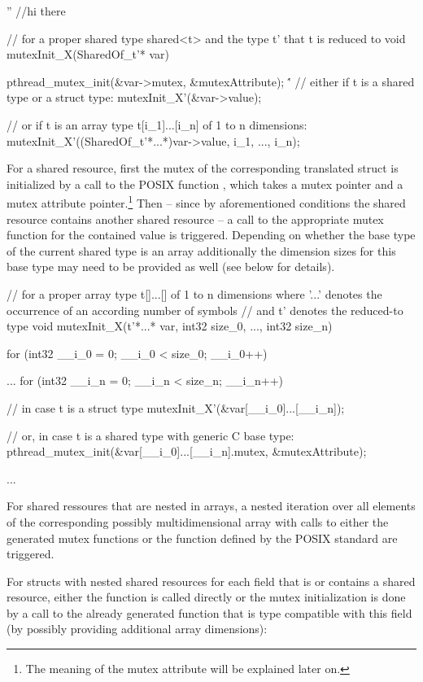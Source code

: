 \begin{ccode}
''
//hi there
\end{ccode}
\begin{ccode}
// for a proper shared type shared<t> and the type t' that t is reduced to
void mutexInit_X(SharedOf_t'* var) { 
  pthread_mutex_init(&var->mutex, &mutexAttribute);
  \''
  // either if t is a shared type or a struct type:
  mutexInit_X'(&var->value); 
  
  // or if t is an array type t[i_1]...[i_n] of 1 to n dimensions:
  mutexInit_X'((SharedOf_t'*...*)var->value, i_1, ..., i_n); 
}
\end{ccode}
For a shared resource, first the mutex of the corresponding translated struct is initialized by a call to the POSIX function , which takes a mutex pointer and a mutex attribute pointer.\footnote{The meaning of the mutex attribute will be explained later on.} Then -- since by aforementioned conditions the shared resource contains another shared resource -- a call to the appropriate mutex function for the contained value is triggered. Depending on whether the base type of the current shared type is an array additionally the dimension sizes for this base type may need to be provided as well (see below for details).

\begin{ccode}
// for a proper array type t[]...[] of 1 to n dimensions where '...' denotes the occurrence of an according number of symbols 
// and t' denotes the reduced-to type
void mutexInit_X(t'*...* var, int32 size_0, ..., int32 size_n) { 
  for (int32 __i_0 = 0; __i_0 < size_0; __i_0++) { 
    ...
      for (int32 __i_n = 0; __i_n < size_n; __i_n++) {
        // in case t is a struct type
        mutexInit_X'(&var[__i_0]...[__i_n]);
        
        // or, in case t is a shared type with generic C base type:
        pthread_mutex_init(&var[__i_0]...[__i_n].mutex, &mutexAttribute);
      }
    ...
  } 
}
\end{ccode}
For shared ressoures that are nested in arrays, a nested iteration over all elements of the corresponding possibly multidimensional array with calls to either the generated mutex functions or the function defined by the POSIX standard are triggered.

For structs with nested shared resources for each field that is or contains a shared resource, either the  function is called directly or the mutex initialization is done by a call to the already generated function that is type compatible with this field (by possibly providing additional array dimensions):

